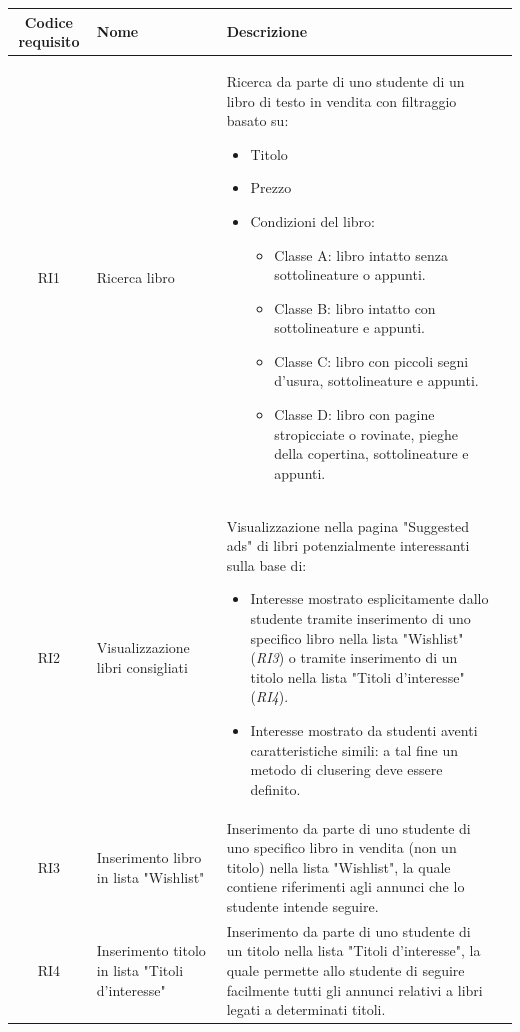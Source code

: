 \documentclass[10pt,a4paper]{report}
\begin{document}
	\begin{tabular}{cp{3cm}p{9cm}p{1cm}}
		Codice requisito&Nome&Descrizione\\ \hline
		RI1&Ricerca libro&Ricerca da parte di uno studente di un libro di testo in vendita con filtraggio basato su:
		\begin{itemize}
			\item Titolo
			\item Prezzo
			\item Condizioni del libro:
			\begin{itemize}
				\item Classe A: libro intatto senza sottolineature o appunti.
				\item Classe B: libro intatto con sottolineature e appunti.
				\item Classe C: libro con piccoli segni d'usura, sottolineature e appunti.
				\item Classe D: libro con pagine stropicciate o rovinate, pieghe della copertina, sottolineature e appunti.
			\end{itemize}
			
		\end{itemize}\\ \hline
		RI2&Visualizzazione libri consigliati&Visualizzazione nella pagina "Suggested ads" di libri potenzialmente interessanti sulla base di:
		\begin{itemize}
			\item Interesse mostrato esplicitamente dallo studente tramite inserimento di uno specifico libro nella lista "Wishlist" (\textit{RI3}) o tramite inserimento di un titolo nella lista "Titoli d'interesse" (\textit{RI4}).
			\item Interesse mostrato da studenti aventi caratteristiche simili: a tal fine un metodo di clusering deve essere definito.
		\end{itemize}\\ \hline
		RI3&Inserimento libro in lista "Wishlist"&Inserimento da parte di uno studente di uno specifico libro in vendita (non un titolo) nella lista "Wishlist", la quale contiene riferimenti agli annunci che lo studente intende seguire.\\ \hline
		RI4&Inserimento titolo in lista "Titoli d'interesse"&Inserimento da parte di uno studente di un titolo nella lista "Titoli d'interesse", la quale permette allo studente di seguire facilmente tutti gli annunci relativi a libri legati a determinati titoli.\\ \hline
	\end{tabular}
\end{document}
